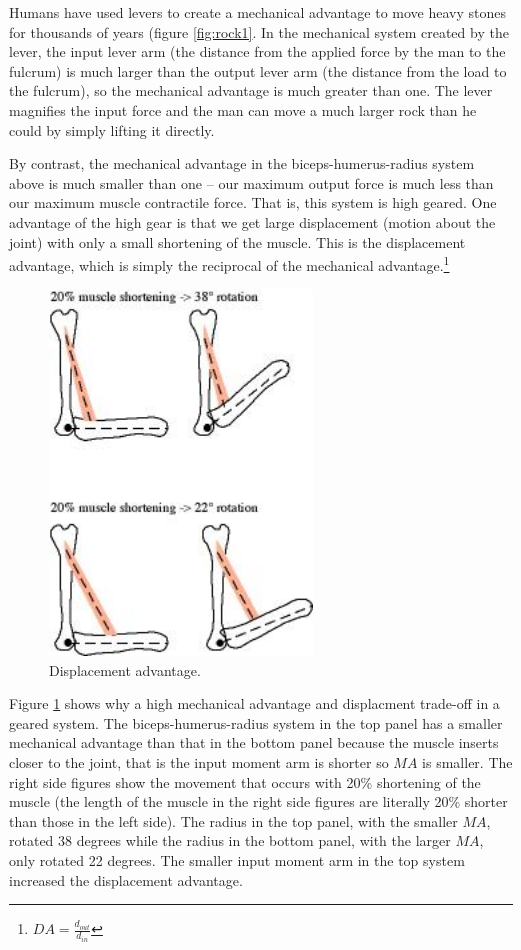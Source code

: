 \documentclass[]{book}
\let\rmarkdownfootnote\footnote%
\def\footnote{\protect\rmarkdownfootnote}
\begin{document}
Humans have used levers to create a mechanical advantage to move heavy
stones for thousands of years (figure \ref{fig:rock1}. In the mechanical
system created by the lever, the input lever arm (the distance from the
applied force by the man to the fulcrum) is much larger than the output
lever arm (the distance from the load to the fulcrum), so the mechanical
advantage is much greater than one. The lever magnifies the input force
and the man can move a much larger rock than he could by simply lifting
it directly.

By contrast, the mechanical advantage in the biceps-humerus-radius
system above is much smaller than one -- our maximum output force is
much less than our maximum muscle contractile force. That is, this
system is high geared. One advantage of the high gear is that we get
large displacement (motion about the joint) with only a small shortening
of the muscle. This is the displacement advantage, which is simply the
reciprocal of the mechanical advantage.\footnote{\(DA = \frac{d_{out}}{d_{in}}\)}

\begin{figure}
\includegraphics[width=2.75in]{images/gear_chapter/velocity_advantage} \caption{Displacement advantage.}\label{fig:velocity1}
\end{figure}

Figure \ref{fig:velocity1} shows why a high mechanical advantage and
displacment trade-off in a geared system. The biceps-humerus-radius
system in the top panel has a smaller mechanical advantage than that in
the bottom panel because the muscle inserts closer to the joint, that is
the input moment arm is shorter so \(MA\) is smaller. The right side
figures show the movement that occurs with 20\% shortening of the muscle
(the length of the muscle in the right side figures are literally 20\%
shorter than those in the left side). The radius in the top panel, with
the smaller \(MA\), rotated 38 degrees while the radius in the bottom
panel, with the larger \(MA\), only rotated 22 degrees. The smaller
input moment arm in the top system increased the displacement advantage.
\end{document}
